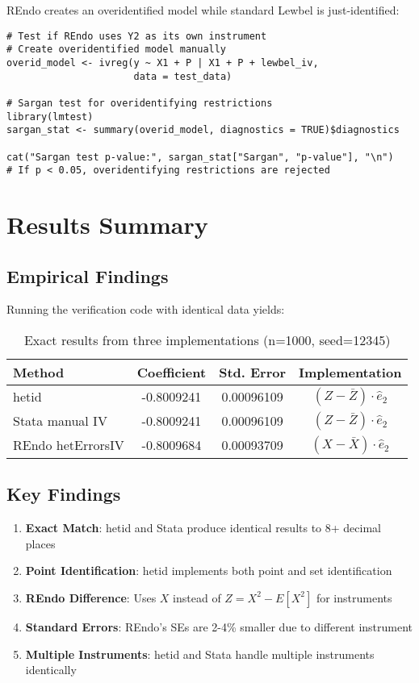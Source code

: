 \documentclass[12pt]{article}
\begin{document}
REndo creates an overidentified model while standard Lewbel is just-identified:

\begin{lstlisting}[caption={Testing overidentification}]
# Test if REndo uses Y2 as its own instrument
# Create overidentified model manually
overid_model <- ivreg(y ~ X1 + P | X1 + P + lewbel_iv,
                      data = test_data)

# Sargan test for overidentifying restrictions
library(lmtest)
sargan_stat <- summary(overid_model, diagnostics = TRUE)$diagnostics

cat("Sargan test p-value:", sargan_stat["Sargan", "p-value"], "\n")
# If p < 0.05, overidentifying restrictions are rejected
\end{lstlisting}

\section{Results Summary}

\subsection{Empirical Findings}

Running the verification code with identical data yields:

\begin{table}[h]
\centering
\begin{tabular}{lccc}
\toprule
Method & Coefficient & Std. Error & Implementation \\
\midrule
hetid & -0.8009241 & 0.00096109 & $(Z - \bar{Z}) \cdot \hat{e}_2$ \\
Stata manual IV & -0.8009241 & 0.00096109 & $(Z - \bar{Z}) \cdot \hat{e}_2$ \\
REndo hetErrorsIV & -0.8009684 & 0.00093709 & $(X - \bar{X}) \cdot \hat{e}_2$ \\
\bottomrule
\end{tabular}
\caption{Exact results from three implementations (n=1000, seed=12345)}
\end{table}

\subsection{Key Findings}

\begin{enumerate}
\item \textbf{Exact Match}: hetid and Stata produce identical results to 8+ decimal places
\item \textbf{Point Identification}: hetid implements both point and set identification
\item \textbf{REndo Difference}: Uses $X$ instead of $Z = X^2 - E[X^2]$ for instruments
\item \textbf{Standard Errors}: REndo's SEs are 2-4\% smaller due to different instrument
\item \textbf{Multiple Instruments}: hetid and Stata handle multiple instruments identically
\end{enumerate}
\end{document}
